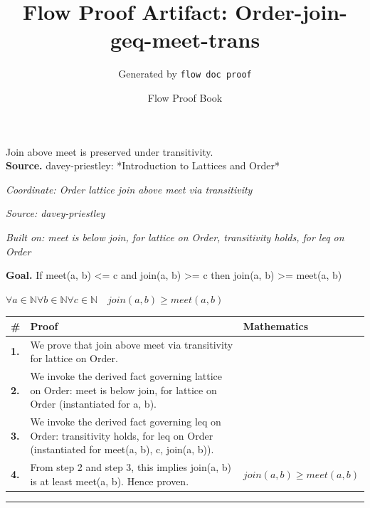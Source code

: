\documentclass[11pt]{article}
\title{Flow Proof Artifact: Order-join-geq-meet-trans}
\author{Generated by \texttt{flow doc proof}}
\date{Flow Proof Book}
\theoremstyle{definition}
\begin{document}
\maketitle
Join above meet is preserved under transitivity.\\[0.5em]
\textbf{Source.} davey-priestley: *Introduction to Lattices and Order*\\[0.5em]
\bigskip
{}\par
\smallskip\noindent\textit{Coordinate: Order \cdot lattice \cdot join above meet via transitivity}\par
\smallskip\noindent\textit{Source: davey-priestley}\par
\smallskip\noindent\textit{Built on: meet is below join, for lattice on Order, transitivity holds, for leq on Order}\par
\medskip
\noindent\textbf{Goal.} If meet(a, b) <= c and join(a, b) >= c then join(a, b) >= meet(a, b)\par
\noindent$\displaystyle \forall a \in \mathbb{N} \forall b \in \mathbb{N} \forall c \in \mathbb{N}\quad join(a, b) \ge meet(a, b)$\par
\medskip
\noindent
\begin{tabular}{@{} >{\raggedright\arraybackslash}p{} >{\raggedright\arraybackslash}p{} >{\raggedleft\arraybackslash}p{} @{}}
\textbf{\#} & \textbf{Proof} & \textbf{Mathematics} \\
\midrule
\textbf{1.} & We prove that join above meet via transitivity for lattice on Order. & \\[0.45em]
\textbf{2.} & We invoke the derived fact governing lattice on Order: meet is below join, for lattice on Order (instantiated for a, b). & \\[0.45em]
\textbf{3.} & We invoke the derived fact governing leq on Order: transitivity holds, for leq on Order (instantiated for meet(a, b), c, join(a, b)). & \\[0.45em]
\textbf{4.} & From step 2 and step 3, this implies join(a, b) is at least meet(a, b). Hence proven. & $\displaystyle join(a, b) \ge meet(a, b)$ \\[0.45em]
\bottomrule
\end{tabular}
\label{thm:Order-lattice-join_above_meet_via_transitivity}
\par\medskip\hrule
\end{document}
